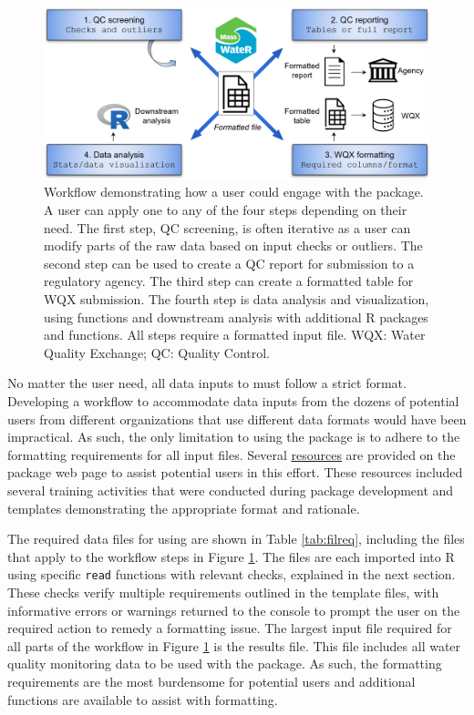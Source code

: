 \begin{figure}
\includegraphics[width=1\linewidth]{figs/workflow} \caption{Workflow demonstrating how a user could engage with the  package.  A user can apply one to any of the four steps depending on their need.  The first step, QC screening, is often iterative as a user can modify parts of the raw data based on input checks or outliers.  The second step can be used to create a QC report for submission to a regulatory agency.  The third step can create a formatted table for WQX submission.  The fourth step is data analysis and visualization, using  functions and downstream analysis with additional R packages and functions.  All steps require a formatted input file.  WQX: Water Quality Exchange; QC: Quality Control.}\label{fig:workflow}
\end{figure}

No matter the user need, all data inputs to  must follow a strict format. Developing a workflow to accommodate data inputs from the dozens of potential users from different organizations that use different data formats would have been impractical. As such, the only limitation to using the package is to adhere to the formatting requirements for all input files. Several \href{https://massbays-tech.github.io/MassWateR/RESOURCES.html}{resources} are provided on the package web page to assist potential users in this effort. These resources included several training activities that were conducted during package development and templates demonstrating the appropriate format and rationale.

The required data files for using  are shown in Table \ref{tab:filreq}, including the files that apply to the workflow steps in Figure \ref{fig:workflow}. The files are each imported into R using specific \texttt{read} functions with relevant checks, explained in the next section. These checks verify multiple requirements outlined in the template files, with informative errors or warnings returned to the console to prompt the user on the required action to remedy a formatting issue. The largest input file required for all parts of the workflow in Figure \ref{fig:workflow} is the results file. This file includes all water quality monitoring data to be used with the package. As such, the formatting requirements are the most burdensome for potential users and additional functions are available to assist with formatting.

